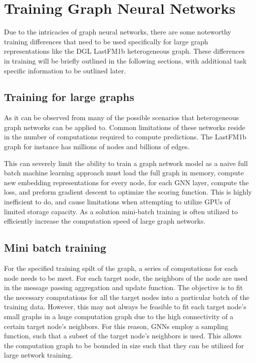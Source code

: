 \section{Training Graph Neural Networks}
Due to the intricacies of graph neural networks, there are some noteworthy training differences that need to be used specifically for large graph representations like the DGL LastFM1b heterogeneous graph. These differences in training will be briefly outlined in the following sections, with additional task specific information to be outlined later.

\subsection{Training for large graphs}
As it can be observed from many of the possible scenarios that heterogeneous graph networks can be applied to. Common limitations of these networks reside in the number of computations required to compute predictions. The LastFM1b graph for instance has millions of nodes and billions of edges. \cite{Schedl2016}

This can severely limit the ability to train a graph network model as a naive full batch machine learning approach must load the full graph in memory, compute new embedding representations for every node, for each GNN layer, compute the loss, and preform gradient descent to optimize the scoring function. This is highly inefficient to do, and cause limitations when attempting to utilize GPUs of limited storage capacity. As a solution mini-batch training is often utilized to efficiently increase the computation speed of large graph networks.

\subsection{Mini batch training}For the specified training spilt of the graph, a series of computations for each node needs to be meet. For each target node, the neighbors of the node are used in the message passing aggregation and update function. The objective is to fit the necessary computations for all the target nodes into a particular batch of the training data. However, this may not always be feasible to fit each target node's small graphs in a huge computation graph due to the high connectivity of a certain target node's neighbors. For this reason, GNNs employ a sampling function, such that a subset of the target node's neighbors is used. This allows the computation graph to be bounded in size such that they can be utilized for large network training.

